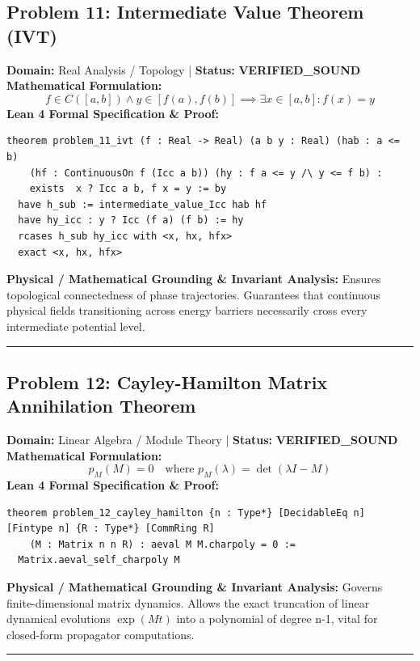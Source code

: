 \documentclass[10pt,a4paper]{article}
\begin{document}
\subsection*{Problem 11: Intermediate Value Theorem (IVT)}
\textbf{Domain:} Real Analysis / Topology \quad | \quad \textbf{Status:} \textcolor{green!70!black}{\textbf{VERIFIED\_SOUND}}\\
\textbf{Mathematical Formulation:}
\begin{equation*}
  f \in C([a, b]) \wedge y \in [f(a), f(b)] \implies \exists x \in [a, b]: f(x) = y
\end{equation*}
\textbf{Lean 4 Formal Specification \& Proof:}
\begin{lstlisting}
theorem problem_11_ivt (f : Real -> Real) (a b y : Real) (hab : a <= b) 
    (hf : ContinuousOn f (Icc a b)) (hy : f a <= y /\ y <= f b) : 
    exists  x ? Icc a b, f x = y := by
  have h_sub := intermediate_value_Icc hab hf
  have hy_icc : y ? Icc (f a) (f b) := hy
  rcases h_sub hy_icc with <x, hx, hfx>
  exact <x, hx, hfx>
\end{lstlisting}
\textbf{Physical / Mathematical Grounding \& Invariant Analysis:}
Ensures topological connectedness of phase trajectories. Guarantees that continuous physical fields transitioning across energy barriers necessarily cross every intermediate potential level.
\vspace{0.8em}\hrule\vspace{0.8em}
\subsection*{Problem 12: Cayley-Hamilton Matrix Annihilation Theorem}
\textbf{Domain:} Linear Algebra / Module Theory \quad | \quad \textbf{Status:} \textcolor{green!70!black}{\textbf{VERIFIED\_SOUND}}\\
\textbf{Mathematical Formulation:}
\begin{equation*}
  p_M(M) = 0 \quad \text{where } p_M(\lambda) = \det(\lambda I - M)
\end{equation*}
\textbf{Lean 4 Formal Specification \& Proof:}
\begin{lstlisting}
theorem problem_12_cayley_hamilton {n : Type*} [DecidableEq n] [Fintype n] {R : Type*} [CommRing R] 
    (M : Matrix n n R) : aeval M M.charpoly = 0 :=
  Matrix.aeval_self_charpoly M
\end{lstlisting}
\textbf{Physical / Mathematical Grounding \& Invariant Analysis:}
Governs finite-dimensional matrix dynamics. Allows the exact truncation of linear dynamical evolutions $\exp(Mt)$ into a polynomial of degree n-1, vital for closed-form propagator computations.
\vspace{0.8em}\hrule\vspace{0.8em}
\end{document}
